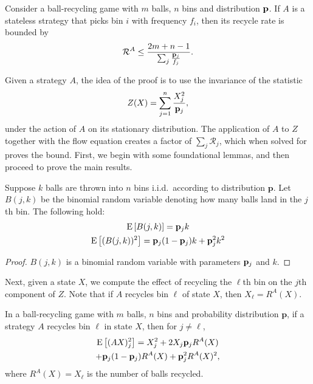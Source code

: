 \begin{lemma}\label{lem:freqbound}
	Consider a ball-recycling game with $m$ balls, $n$ bins and distribution
	$\mathbf{p}$. If $A$ is a stateless strategy that picks bin $i$ with frequency
	$f_i$, then its recycle rate is bounded by
	\begin{equation}
		\mathcal{R}^A \leq \frac{2m+n-1}{\sum_j\frac{\mathbf{p}_j}{f_j}}.
	\end{equation}
\end{lemma}

Given a strategy $A$, the idea of the proof is to use the invariance of the
statistic
\begin{equation}
	Z(X) = \sum_{j = 1}^n \frac{X_j^2}{\mathbf{p}_j},
\end{equation}
under the action of $A$ on its stationary distribution. The application of $A$
to $Z$ together with the flow equation creates a factor of $\sum_j
\mathcal{R}_j$, which when solved for proves the bound. First, we begin with
some foundational lemmas, and then proceed to prove the main results.

\begin{lemma}
	Suppose $k$ balls are thrown into $n$ bins i.i.d.\ according to distribution
	$\mathbf{p}$. Let $B(j,k)$ be the binomial random variable denoting how
	many balls land in the $j$th bin.  The following hold:
	\begin{gather}
		\mathrm{E}\left[B(j,k)\right] = \mathbf{p}_jk \\
		\mathrm{E}\left[(B(j,k))^2\right] = \mathbf{p}_j(1-\mathbf{p}_j)k + \mathbf{p}_j^2k^2
	\end{gather}
\end{lemma}

\begin{proof}
	$B(j,k)$ is a binomial random variable with parameters $\mathbf{p}_j$ and $k$.
\end{proof}

Next, given a state $X$, we compute the effect of recycling the $\ell$th bin on
the $j$th component of $Z$. Note that if $A$ recycles bin $\ell$ of state $X$,
then $X_\ell = R^A(X)$.
\begin{lemma}
	In a ball-recycling game with $m$ balls, $n$ bins and probability
	distribution $\mathbf{p}$, if a strategy $A$ recycles bin $\ell$ in state
	$X$, then for $j \neq \ell$,
	\begin{multline}
		\mathrm{E}\left[(AX)_j^2\right]=X_j^2 + 2X_j\mathbf{p}_jR^A(X) \\
		+ \mathbf{p}_j(1-\mathbf{p}_j)R^A(X) + \mathbf{p}_j^2R^A(X)^2,
	\end{multline}
	where $R^A(X) = X_\ell$ is the number of balls recycled.
\end{lemma}

